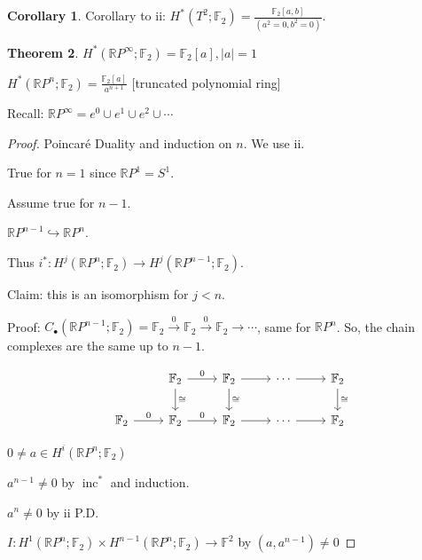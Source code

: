 \documentclass{article}
\theoremstyle{definition}
\newtheorem{theorem}{Theorem}
\newtheorem{corollary}[theorem]{Corollary}
\begin{document}
    \begin{corollary}
        Corollary to ii: \(H^{\ast} (T^2;\mathbb{F}_2) = \frac{\mathbb{F}_2[a,b]}{(a^2 = 0, b^2 = 0)}\).
    \end{corollary}

    \begin{theorem}
        \(H^{\ast} (\mathbb{R} P^{\infty}; \mathbb{F}_2) = \mathbb{F}_2[a], \vert a \vert = 1\)
        
        \(H^{\ast} (\mathbb{R} P^n; \mathbb{F}_2) = \frac{\mathbb{F}_2[a]}{a^{n+1}}\) [truncated polynomial ring] 

        Recall: \(\mathbb{R} P^{\infty} = e^0 \cup e^1 \cup e^2 \cup\cdots \) 
    \end{theorem}

    \begin{proof}
        Poincar\'e Duality and induction on \(n\). We use ii.

        True for \(n=1\) since \(\mathbb{R} P^1 = S^1\).

        Assume true for \(n-1\). 

        \(\mathbb{R} P^{n-1} \hookrightarrow \mathbb{R} P^n\).

        Thus \(i^{\ast} : H^j(\mathbb{R} P^n; \mathbb{F}_2) \to H^j(\mathbb{R} P^{n-1} ; \mathbb{F}_2)\).
        
        Claim: this is an isomorphism for \(j < n\).

        Proof: \(C_\bullet(\mathbb{R} P^{n-1}; \mathbb{F}_2) = \mathbb{F}_2 \xrightarrow{0} \mathbb{F}_2 \xrightarrow{0} \mathbb{F}_2 \to \cdots\), same for \(\mathbb{R} P^n\). So, the chain complexes are the same up to \(n - 1\).
        
        \[
            \begin{tikzcd}
                & \mathbb{F}_2 \ar[r,"0"] \ar[d,"\cong"] & \mathbb{F}_2 \ar[r] \ar[d,"\cong"] & \cdots \ar[r] & \mathbb{F}_2 \ar[d,"\cong"] \\
                \mathbb{F}_2 \ar[r,"0"] & \mathbb{F}_2 \ar[r,"0"] & \mathbb{F}_2 \ar[r] & \cdots \ar[r] & \mathbb{F}_2
            \end{tikzcd}
        \]

        \(0 \neq a \in H^i(\mathbb{R} P^n; \mathbb{F}_2)\)

        \(a^{n-1} \neq 0\) by \(\operatorname{inc}^{\ast}\) and induction.

        \(a^n \neq 0\) by ii P.D.

        \(I: H^1(\mathbb{R}P^n; \mathbb{F}_2) \times H^{n-1} (\mathbb{R} P^n; \mathbb{F}_2) \to \mathbb{F}^2\) by \((a, a^{n-1}) \neq 0\) 
    \end{proof}
\end{document}
